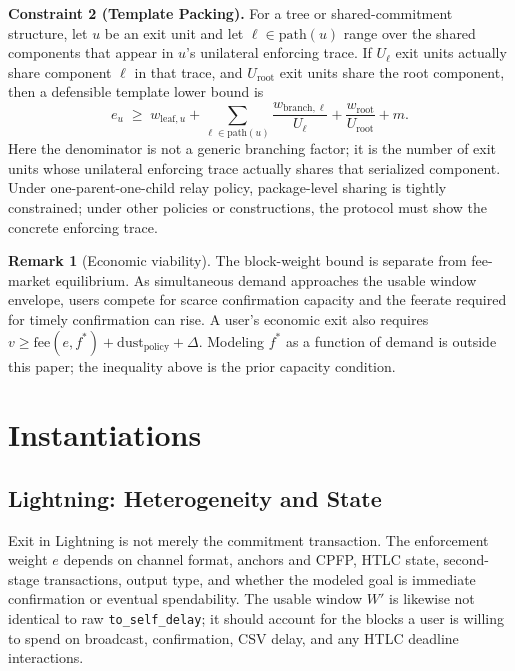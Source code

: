 \documentclass{article}
\theoremstyle{definition}
\newtheorem{remark}{Remark}
\begin{document}
\medskip
\noindent\textbf{Constraint 2 (Template Packing).}
For a tree or shared-commitment structure, let $u$ be an exit unit and let $\ell \in \mathrm{path}(u)$ range over the shared components that appear in $u$'s unilateral enforcing trace. If $U_\ell$ exit units actually share component $\ell$ in that trace, and $U_{\mathrm{root}}$ exit units share the root component, then a defensible template lower bound is
\small
\begin{equation*}
e_u \;\ge\; w_{\mathrm{leaf},u}
+ \sum_{\ell \in \mathrm{path}(u)} \frac{w_{\mathrm{branch},\ell}}{U_\ell}
+ \frac{w_{\mathrm{root}}}{U_{\mathrm{root}}}
+ m.
\end{equation*}
\normalsize
Here the denominator is not a generic branching factor; it is the number of exit units whose unilateral enforcing trace actually shares that serialized component. Under one-parent-one-child relay policy, package-level sharing is tightly constrained; under other policies or constructions, the protocol must show the concrete enforcing trace.

\begin{remark}[Economic viability]
The block-weight bound is separate from fee-market equilibrium. As simultaneous demand approaches the usable window envelope, users compete for scarce confirmation capacity and the feerate required for timely confirmation can rise. A user's economic exit also requires $v \ge \mathrm{fee}(e,f^*)+\mathrm{dust}_{\mathrm{policy}}+\Delta$. Modeling $f^*$ as a function of demand is outside this paper; the inequality above is the prior capacity condition.
\end{remark}

\section{Instantiations}
\subsection{Lightning: Heterogeneity and State}
Exit in Lightning is not merely the commitment transaction. The enforcement weight $e$ depends on channel format, anchors and CPFP, HTLC state, second-stage transactions, output type, and whether the modeled goal is immediate confirmation or eventual spendability. The usable window $W'$ is likewise not identical to raw \texttt{to\_self\_delay}; it should account for the blocks a user is willing to spend on broadcast, confirmation, CSV delay, and any HTLC deadline interactions.
\end{document}
